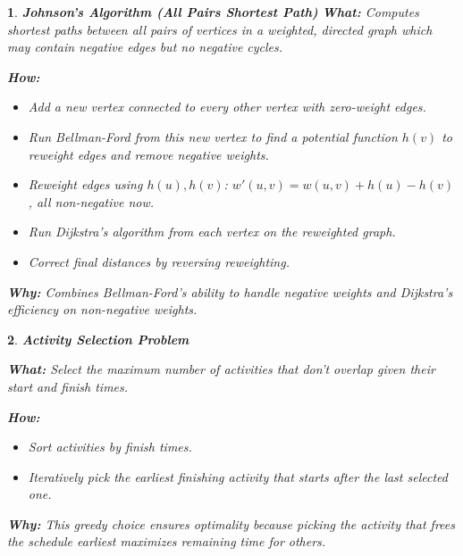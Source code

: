 \documentclass[%
addpoints]{exam}
\theoremstyle{problem}
\newtheorem{p}{}
\begin{document}
\begin{p}
\textbf{Johnson's Algorithm (All Pairs Shortest Path)}
\textbf{What:}
Computes shortest paths between all pairs of vertices in a weighted, directed graph which may contain negative edges but no negative cycles.

\textbf{How:}
\begin{itemize}
\item Add a new vertex connected to every other vertex with zero-weight edges.
\item Run Bellman-Ford from this new vertex to find a potential function $h(v)$ to reweight edges and remove negative weights.
\item Reweight edges using $h(u), h(v)$: $w'(u,v) = w(u,v) + h(u) - h(v)$, all non-negative now.
\item Run Dijkstra's algorithm from each vertex on the reweighted graph.
\item Correct final distances by reversing reweighting.
\end{itemize}

\textbf{Why:} Combines Bellman-Ford's ability to handle negative weights and Dijkstra's efficiency on non-negative weights.
\hfill \end{p}

\begin{p}
\textbf{Activity Selection Problem}

\textbf{What:}
Select the maximum number of activities that don't overlap given their start and finish times.

\textbf{How:}
\begin{itemize}
\item Sort activities by finish times.
\item Iteratively pick the earliest finishing activity that starts after the last selected one.
\end{itemize}

\textbf{Why:} This greedy choice ensures optimality because picking the activity that frees the schedule earliest maximizes remaining time for others.
\hfill \end{p}
\end{document}
